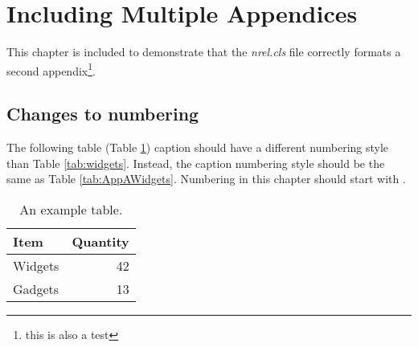 \section{Including Multiple Appendices}
This chapter is included to demonstrate that the \emph{nrel.cls} file correctly formats a second appendix\footnote{this is also a test}.

\subsection{Changes to numbering}
The following table (Table \ref{tab:AppBWidgets}) caption should have a different numbering style than Table \ref{tab:widgets}. Instead, the caption numbering style should be the same as Table \ref{tab:AppAWidgets}. Numbering in this chapter should start with \thechapter.

\begin{table}[!h]
\centering
\caption{An example table.}\label{tab:AppBWidgets}
\begin{tabular}{lr}
Item & Quantity \\
\hline
Widgets & 42 \\
Gadgets & 13
\end{tabular}
\end{table}
